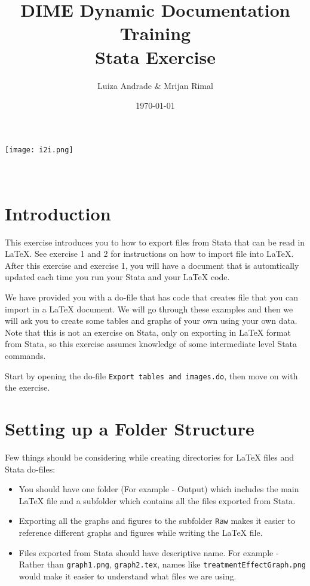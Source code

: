 \documentclass[]{article}
\title{DIME Dynamic Documentation Training \\ Stata Exercise}
\author{Luiza Andrade \& Mrijan Rimal}
\date{\today}
\begin{document}
\makeatletter
\begin{titlepage}
	\begin{center}
		\texttt{[image: i2i.png]}\\[10ex]
		{\LARGE \bfseries  \@title }\\[2ex] 
		{\Large  \@author}\\[20ex] 
		{\large \@date}
	\end{center}
\end{titlepage}
\makeatother

\section*{Introduction}
This exercise introduces you to how to export files from Stata that can be read in {\LaTeX}. See exercise 1 and 2 for instructions on how to import file into {\LaTeX}. After this exercise and exercise 1, you will have a document that is automtically updated each time you run your Stata and your {\LaTeX} code.

We have provided you with a do-file that has code that creates file that you can import in a {\LaTeX} document. We will go through these examples and then we will ask you to create some tables and graphs of your own using your own data. Note that this is not an exercise on Stata, only on exporting in {\LaTeX} format from Stata, so this exercise assumes knowledge of some intermediate level Stata commands.

Start by opening the do-file \texttt{Export tables and images.do}, then move on with the exercise.

\section*{Setting up a Folder Structure}

Few things should be considering while creating directories for {\LaTeX} files and Stata do-files:

\begin{itemize}
	\item You should have one folder (For example - Output) which includes the main {\LaTeX} file and a subfolder which contains all the files exported from Stata. 
	\item Exporting all the graphs and figures to the subfolder \texttt{Raw} makes it easier to reference different graphs and figures while writing the {\LaTeX} file. 
	\item Files exported from Stata should have descriptive name. For example - Rather than \texttt{graph1.png}, \texttt{graph2.tex}, names like \texttt{treatmentEffectGraph.png} would make it easier to understand what files we are using.
\end{itemize}
\end{document}

